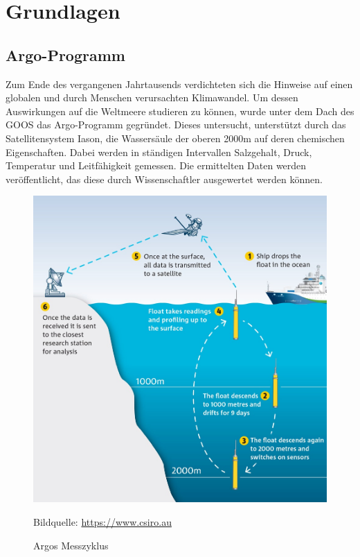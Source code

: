 \section{Grundlagen}




    \subsection{Argo-Programm}


    Zum Ende des vergangenen Jahrtausends verdichteten sich die Hinweise auf einen globalen und durch Menschen verursachten Klimawandel. Um dessen Auswirkungen auf die Weltmeere studieren zu können, wurde unter dem Dach des \gls{GOOS} das Argo-Programm gegründet. Dieses untersucht, unterstützt durch das Satellitensystem Iason, die Wassersäule der oberen 2000m auf deren chemischen Eigenschaften. Dabei werden in ständigen Intervallen Salzgehalt, Druck, Temperatur und Leitfähigkeit gemessen. Die ermittelten Daten werden veröffentlicht, das diese durch Wissenschaftler ausgewertet werden können.


    \begin{figure}[h]
        \centering
        \includegraphics{pix/operation_park_profile.jpg}
        \caption[Argos Messzyklus]{Argos  Messzyklus}
        \footnotesize{
            Bildquelle: \href{https://www.csiro.au/en/Research/OandA/Areas/Marine-technologies/Argo-robotic-floats}
                        {\url{https://www.csiro.au}}
        }
        \label{fig:Argo-messzyklus}
    \end{figure}

